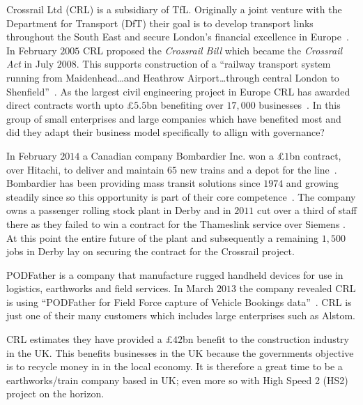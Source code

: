 {}

Crossrail Ltd (CRL) is a subsidiary of TfL.
Originally a joint venture with the Department for Transport (DfT) their goal is to develop transport links throughout the South East and secure London's financial excellence in Europe~\cite{crossrail:about}.
In February $2005$ CRL proposed the \emph{Crossrail Bill} which became the \emph{Crossrail Act} in July $2008$.
This supports construction of a ``railway transport system running from Maidenhead\dots and Heathrow Airport\dots through central London to Shenfield''~\cite{crossrail:act}.
As the largest civil engineering project in Europe CRL has awarded direct contracts worth upto \pounds $5.5$bn benefiting over $17,000$ businesses~\cite{crossrail:suppliers}.
In this group of small enterprises and large companies which have benefited most and did they adapt their business model specifically to allign with governance?  

In February $2014$ a Canadian company Bombardier Inc. won a \pounds $1$bn contract, over Hitachi, to deliver and maintain $65$ new trains and a depot for the line~\cite{bbc:bombardier,tfl:bombardier}.  
Bombardier has been providing mass transit solutions since $1974$ and growing steadily since so this opportunity is part of their core competence~\cite{bombardier:about}.
The company owns a passenger rolling stock plant in Derby and in $2011$ cut over a third of staff there as they failed to win a contract for the Thameslink service over Siemens \citeneeded{}.
At this point the entire future of the plant and subsequently a remaining $1,500$ jobs in Derby lay on securing the contract for the Crossrail project.

PODFather is a company that manufacture rugged handheld devices for use in logistics, earthworks and field services.
In March $2013$ the company revealed CRL is using ``PODFather for Field Force capture of Vehicle Bookings data''~\cite{podfather:crl}.
CRL is just one of their many customers which includes large enterprises such as Alstom. 


CRL estimates they have provided a \pounds $42$bn benefit to the construction industry in the UK.
This benefits businesses in the UK because the governments objective is to recycle money in in the local economy.
It is therefore a great time to be a earthworks/train company based in UK; even more so with High Speed 2 (HS2) project on the horizon.

